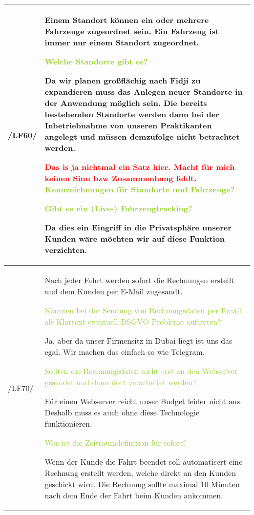 \begin{tabular}[ht] {l | p{13cm}}
    \hline
    /LF60/ & Einem Standort können ein oder mehrere Fahrzeuge zugeordnet sein. Ein Fahrzeug ist immer nur einem Standort zugeordnet. 
    
    \textcolor{YellowGreen}{Welche Standorte gibt es?}

    \textcolor{NavyBlue}{Da wir planen großflächig nach Fidji zu expandieren muss das Anlegen neuer Standorte in der Anwendung möglich sein. Die bereits bestehenden Standorte werden dann bei der Inbetriebnahme von unseren Praktikanten angelegt und müssen demzufolge nicht betrachtet werden.}

    \textcolor{Red}{Das is ja nichtmal ein Satz hier. Macht für mich keinen Sinn bzw Zusammenhang fehlt.}
    \textcolor{YellowGreen}{Kennzeichnungen für Standorte und Fahrzeuge?}

    \textcolor{NavyBlue}{}
    
    \textcolor{YellowGreen}{Gibt es ein (Live-) Fahrzeugtracking?}
    
    \textcolor{NavyBlue}{Da dies ein Eingriff in die Privatsphäre unserer Kunden wäre möchten wir auf diese Funktion verzichten.}
    \\
    \hline
    /LF70/ & Nach jeder Fahrt werden sofort die Rechnungen erstellt und dem Kunden per  
    E-Mail zugesandt. 

    \textcolor{YellowGreen}{Könnten bei der Sendung von Rechnungsdaten per Email als Klartext eventuell DSGVO-Probleme auftreten?}

    \textcolor{NavyBlue}{Ja, aber da unser Firmensitz in Dubai liegt ist uns das egal. Wir machen das einfach so wie Telegram.}

    \textcolor{YellowGreen}{Sollten die Rechnungsdaten nicht erst an den Webserver gesendet und dann dort verarbeitet werden?}

    \textcolor{NavyBlue}{Für einen Webserver reicht unser Budget leider nicht aus. Deshalb muss es auch ohne diese Technologie funktionieren.}

    \textcolor{YellowGreen}{Was ist die Zeitraumdefinition für \grqq{}sofort\grqq{}?}

    \textcolor{NavyBlue}{Wenn der Kunde die Fahrt beendet soll automatisert eine Rechnung erstellt werden, welche direkt an den Kunden geschickt wird. Die Rechnung sollte maximal 10 Minuten nach dem Ende der Fahrt beim Kunden ankommen.}
    \\
    \hline
\end{tabular}


